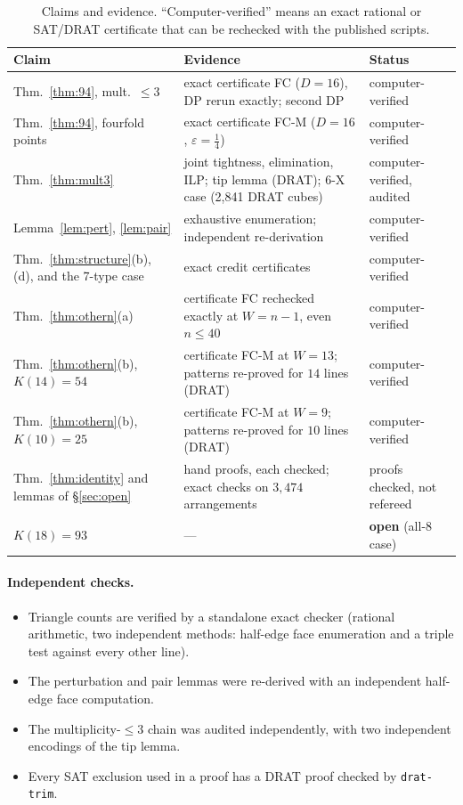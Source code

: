\documentclass[11pt]{article}
\theoremstyle{definition}
\theoremstyle{remark}
\begin{document}
\begin{table}[t]
\centering\small
\begin{tabular}{p{4.6cm}p{6.4cm}p{3.2cm}}
\toprule
Claim & Evidence & Status \\
\midrule
Thm.~\ref{thm:94}, mult.\ $\le 3$ & exact certificate FC ($D=16$), DP rerun exactly; second DP & computer-verified \\
Thm.~\ref{thm:94}, fourfold points & exact certificate FC-M ($D=16$, $\varepsilon=\tfrac14$) & computer-verified \\
Thm.~\ref{thm:mult3} & joint tightness, elimination, ILP; tip lemma (DRAT); 6-X case (2,841 DRAT cubes) & computer-verified, audited \\
Lemma~\ref{lem:pert}, \ref{lem:pair} & exhaustive enumeration; independent re-derivation & computer-verified \\
Thm.~\ref{thm:structure}(b), (d), and the 7-type case & exact credit certificates & computer-verified \\
Thm.~\ref{thm:othern}(a) & certificate FC rechecked exactly at $W=n-1$, even $n\le 40$ & computer-verified \\
Thm.~\ref{thm:othern}(b), $K(14)=54$ & certificate FC-M at $W=13$; patterns re-proved for $14$ lines (DRAT) & computer-verified \\
Thm.~\ref{thm:othern}(b), $K(10)=25$ & certificate FC-M at $W=9$; patterns re-proved for $10$ lines (DRAT) & computer-verified \\
Thm.~\ref{thm:identity} and lemmas of \S\ref{sec:open} & hand proofs, each checked; exact checks on $3{,}474$ arrangements & proofs checked, not refereed \\
$K(18)=93$ & --- & \textbf{open} (all-8 case) \\
\bottomrule
\end{tabular}
\caption{Claims and evidence. ``Computer-verified'' means an exact rational or SAT/DRAT certificate that can be rechecked
with the published scripts.}
\label{tab:status}
\end{table}

\paragraph{Independent checks.}
\begin{itemize}[nosep]
\item Triangle counts are verified by a standalone exact checker (rational arithmetic, two independent methods:
half-edge face enumeration and a triple test against every other line).
\item The perturbation and pair lemmas were re-derived with an independent half-edge face computation.
\item The multiplicity-$\le 3$ chain was audited independently, with two independent encodings of the tip lemma.
\item Every SAT exclusion used in a proof has a DRAT proof checked by \texttt{drat-trim}.
\end{itemize}
\end{document}

